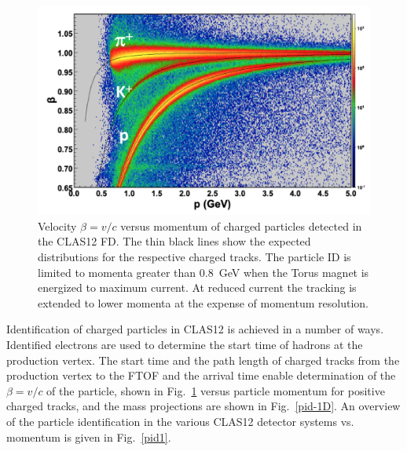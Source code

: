\documentclass[final,3p,twocolumn]{elsarticle}
\begin{document}
\begin{figure}[htbp!]
\centerline{\includegraphics[width=1.1\columnwidth]{FTOF1b_pid.png}}
\caption{Velocity $\beta = v/c $ versus momentum of charged particles detected in the CLAS12 FD. The thin black lines
show the expected distributions for the respective charged tracks. The particle ID is limited to momenta greater than
0.8~GeV when the Torus magnet is energized to maximum current. At reduced current the tracking is extended to lower
momenta at the expense of momentum resolution.}
\label{pid}
\end{figure} 

Identification of charged particles in CLAS12 is achieved in a number of ways. Identified electrons are used to determine
the start time of hadrons at the production vertex. The start time and the path length of charged tracks from the production
vertex to the FTOF and the arrival time enable determination of the $\beta = v/c$ of the particle, shown in Fig.~\ref{pid}
versus particle momentum for positive charged tracks, and the mass projections are shown in Fig.~\ref{pid-1D}.  An overview
of the particle identification in the various CLAS12 detector systems vs. momentum is given in Fig.~\ref{pid1}. 
\end{document}
